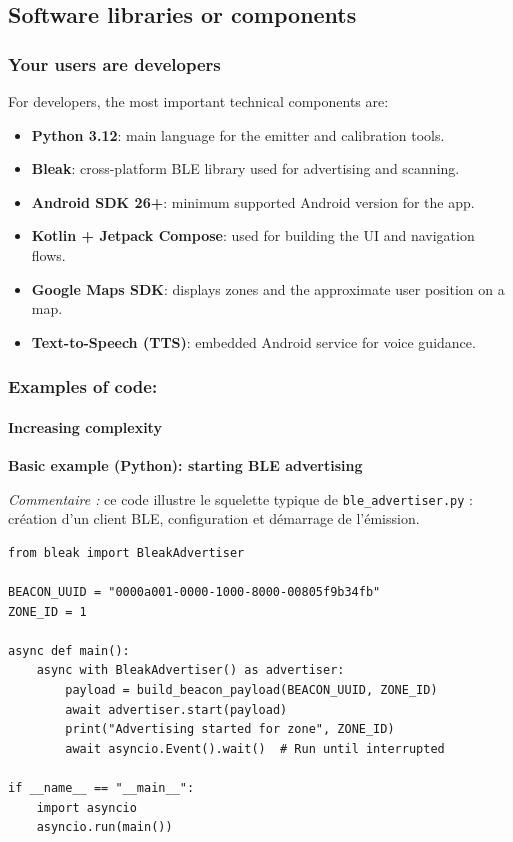 \documentclass[12pt,a4paper]{article}
\begin{document}
\pagebreak

\subsection{Software libraries or components}

\subsubsection{Your users are developers}

For developers, the most important technical components are:

\begin{itemize}
    \item \textbf{Python 3.12}: main language for the emitter and calibration tools.
    \item \textbf{Bleak}: cross-platform BLE library used for advertising and scanning.
    \item \textbf{Android SDK 26+}: minimum supported Android version for the app.
    \item \textbf{Kotlin + Jetpack Compose}: used for building the UI and navigation flows.
    \item \textbf{Google Maps SDK}: displays zones and the approximate user position on a map.
    \item \textbf{Text-to-Speech (TTS)}: embedded Android service for voice guidance.
\end{itemize}

\subsubsection{Examples of code:}

\paragraph{Increasing complexity}

\textbf{Basic example (Python): starting BLE advertising}

\vspace{0.5em}
\noindent\textit{Commentaire :} ce code illustre le squelette typique de \texttt{ble\_advertiser.py} : création d’un client BLE, configuration et démarrage de l’émission.

\lstset{language=Python,basicstyle=\ttfamily\scriptsize}
\begin{verbatim}
from bleak import BleakAdvertiser

BEACON_UUID = "0000a001-0000-1000-8000-00805f9b34fb"
ZONE_ID = 1

async def main():
    async with BleakAdvertiser() as advertiser:
        payload = build_beacon_payload(BEACON_UUID, ZONE_ID)
        await advertiser.start(payload)
        print("Advertising started for zone", ZONE_ID)
        await asyncio.Event().wait()  # Run until interrupted

if __name__ == "__main__":
    import asyncio
    asyncio.run(main())
\end{verbatim}
\normalsize
\end{document}
